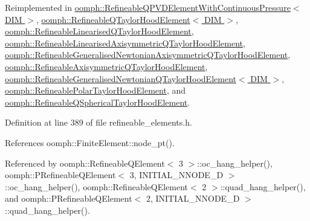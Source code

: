 Reimplemented in \hyperlink{classoomph_1_1RefineableQPVDElementWithContinuousPressure_a935ead3e5472150fe627587abb12cbf8}{oomph\+::\+Refineable\+Q\+P\+V\+D\+Element\+With\+Continuous\+Pressure$<$ D\+I\+M $>$}, \hyperlink{classoomph_1_1RefineableQTaylorHoodElement_a98cdc0f229459c09186a70731cd973d1}{oomph\+::\+Refineable\+Q\+Taylor\+Hood\+Element$<$ D\+I\+M $>$}, \hyperlink{classoomph_1_1RefineableLinearisedQTaylorHoodElement_a85ac5379a96e6ca0cbe712218e494962}{oomph\+::\+Refineable\+Linearised\+Q\+Taylor\+Hood\+Element}, \hyperlink{classoomph_1_1RefineableLinearisedAxisymmetricQTaylorHoodElement_a56710b2dff77c32e1ca90de31f699902}{oomph\+::\+Refineable\+Linearised\+Axisymmetric\+Q\+Taylor\+Hood\+Element}, \hyperlink{classoomph_1_1RefineableGeneralisedNewtonianAxisymmetricQTaylorHoodElement_a23cdbc15e3da1994d71e8b2bab5a53eb}{oomph\+::\+Refineable\+Generalised\+Newtonian\+Axisymmetric\+Q\+Taylor\+Hood\+Element}, \hyperlink{classoomph_1_1RefineableAxisymmetricQTaylorHoodElement_a8545337ffdd94e8311b379f8762bb6af}{oomph\+::\+Refineable\+Axisymmetric\+Q\+Taylor\+Hood\+Element}, \hyperlink{classoomph_1_1RefineableGeneralisedNewtonianQTaylorHoodElement_a698043f19ce65cb9a8cc85bc816ccd7d}{oomph\+::\+Refineable\+Generalised\+Newtonian\+Q\+Taylor\+Hood\+Element$<$ D\+I\+M $>$}, \hyperlink{classoomph_1_1RefineablePolarTaylorHoodElement_a6308630841a165e4152d0765ed468871}{oomph\+::\+Refineable\+Polar\+Taylor\+Hood\+Element}, and \hyperlink{classoomph_1_1RefineableQSphericalTaylorHoodElement_a9c7304678e11298ff3a1d9ead5ea9675}{oomph\+::\+Refineable\+Q\+Spherical\+Taylor\+Hood\+Element}.



Definition at line 389 of file refineable\+\_\+elements.\+h.



References oomph\+::\+Finite\+Element\+::node\+\_\+pt().



Referenced by oomph\+::\+Refineable\+Q\+Element$<$ 3 $>$\+::oc\+\_\+hang\+\_\+helper(), oomph\+::\+P\+Refineable\+Q\+Element$<$ 3, I\+N\+I\+T\+I\+A\+L\+\_\+\+N\+N\+O\+D\+E\+\_\+D $>$\+::oc\+\_\+hang\+\_\+helper(), oomph\+::\+Refineable\+Q\+Element$<$ 2 $>$\+::quad\+\_\+hang\+\_\+helper(), and oomph\+::\+P\+Refineable\+Q\+Element$<$ 2, I\+N\+I\+T\+I\+A\+L\+\_\+\+N\+N\+O\+D\+E\+\_\+D $>$\+::quad\+\_\+hang\+\_\+helper().

\mbox{\label{classoomph_1_1RefineableElement_abc3d0cb0131ebf717ff0620242c9ca2b}} 
